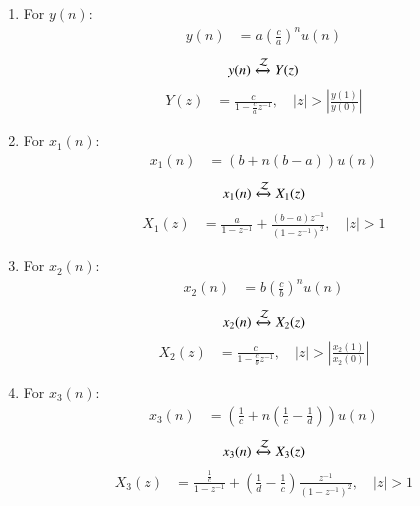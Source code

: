 \documentclass[journal,12pt,twocolumn]{IEEEtran}
\theoremstyle{remark}
\begin{document}
\begin{enumerate}

\item For $y(n)$:
    \begin{align}
        y(n) &= a\left(\frac{c}{a}\right)^n u(n)
    \end{align}
    \begin{equation*}
     y(n)  \xleftrightarrow{\mathcal{Z}} Y(z)
     \end{equation*}
    \begin{align}
        Y(z) &= \frac{c}{1-\frac{c}{a}z^{-1}}, \quad \left|z\right|>\left|\frac{y(1)}{y(0)}\right|
    \end{align}
    
    \item For $x_1(n)$:
    \begin{align}
        x_1(n) &= (b + n(b-a))u(n)
    \end{align}
    \begin{equation*}
   x_1(n)  \xleftrightarrow{\mathcal{Z}} X_1(z)
    \end{equation*}
    \begin{align}
        X_1(z) &= \frac{a}{1-z^{-1}} + \frac{(b-a)z^{-1}}{(1-z^{-1})^2} , \quad |z| > 1
    \end{align}

    \item For $x_2(n)$:
    \begin{align}
        x_2(n) &= b\left(\frac{c}{b}\right)^n u(n)
    \end{align}
    \begin{equation*}
     x_2(n)  \xleftrightarrow{\mathcal{Z}} X_2(z)
     \end{equation*}
    \begin{align}
        X_2(z) &= \frac{c}{1-\frac{c}{b}z^{-1}},  \quad \left|z\right|>\left|\frac{x_2(1)}{x_2(0)}\right|
    \end{align}

    \item For $x_3(n)$:
    \begin{align}
        x_3(n) &= \left(\frac{1}{c} + n\left(\frac{1}{c} - \frac{1}{d}\right)\right)u(n)
    \end{align}
    \begin{equation*}
  x_3(n)  \xleftrightarrow{\mathcal{Z}} X_3(z)
   \end{equation*}
    \begin{align}
        X_3(z) &= \frac{\frac{1}{c}}{1-z^{-1}} + \left(\frac{1}{d} - \frac{1}{c}\right)\frac{z^{-1}}{(1-z^{-1})^2} , \quad |z| > 1
    \end{align}
\end{enumerate}
\end{document}
